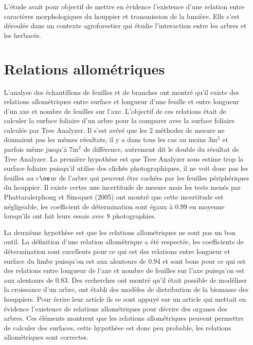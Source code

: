 \documentclass[12pt]{report}
\begin{document}
L'étude avait pour objectif de mettre en évidence l'existence d'une relation entre
caractères morphologiques du houppier et transmission de la lumière. Elle s'est
déroulée dans un contexte agroforestier qui étudie l'interaction entre les
arbres et les herbacés.

\section{Relations allométriques}

L'analyse des échantillons de feuilles et de branches ont montré qu'il existe
des relations allométriques entre surface et longueur d'une feuille et entre
longueur d'un axe et nombre de feuilles sur l'axe. L'objectif de ces relations
était de calculer la surface foliaire d'un arbre pour la comparer avec la
surface foliaire calculée par Tree Analyzer. Il s'est avéré que les 2 méthodes de
mesure ne donnaient pas les mêmes résultats, il y a dans tous les cas au moins
3m$^{2}$ et parfois même jusqu'à 7m$^{2}$ de différence, autrement dit le double
du résultat de Tree Analyzer. La première hypothèse est que Tree Analyzer sous
estime trop la surface foliaire puisqu'il utilise des clichés photographiques, il
ne voit donc pas les feuilles au c$\oe$ur de l'arbre qui peuvent être cachées
par les feuilles périphériques du houppier. Il existe certes une incertitude de
mesure mais les tests menés par Phattaralerphong et Sinoquet (2005) ont montré
que cette incertitude est négligeable, les coefficient de détermination sont
égaux à 0.99 en moyenne lorsqu'ils ont fait leurs essais avec 8 photographies.

La deuxième hypothèse est que les relations allométriques ne sont pas un bon
outil. La définition d'une relation allométrique
a été respectée, les coefficients de détermination sont excellents pour ce qui
est des relations entre longueur et surface du limbe puisqu'on est aux alentours
de 0.94 et sont bons pour ce qui est des relations entre longueur de l'axe et
nombre de feuilles sur l'axe puisqu'on est aux alentours de 0.83. Des recherches
ont montré qu'il était possible de modéliser la croissance d'un arbre,
\citet{MAR_ref41} ont établi des modèles de distribution de la biomasse des
houppiers. Pour écrire leur article ils se sont appuyé sur un article qui
mettait en évidence l'existence de relations allométriques pour décrire des
organes des arbres. Ces éléments montrent que les relations allométriques
peuvent permettre de calculer des surfaces, cette hypothèse est donc peu
probable, les relations allométriques sont correctes.
\end{document}
